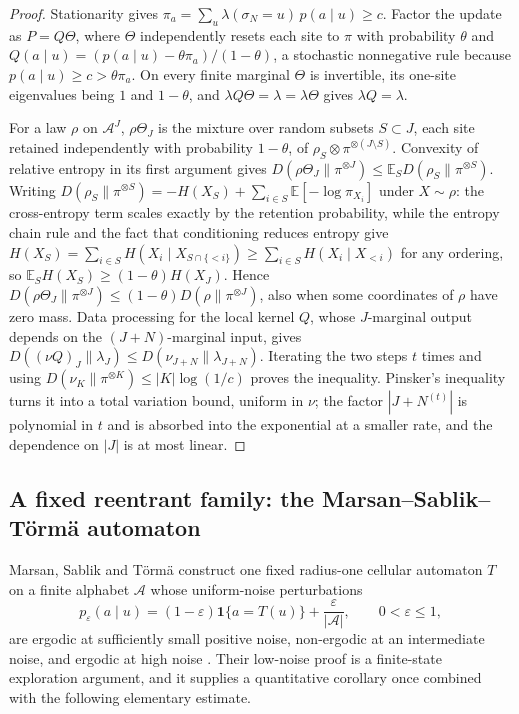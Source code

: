 \documentclass[11pt]{article}
\theoremstyle{plain}
\theoremstyle{definition}
\theoremstyle{remark}
\newcommand{\A}{\mathcal{A}}
\newcommand{\E}{\mathbb{E}}
\newcommand{\eps}{\varepsilon}
\begin{document}
\begin{proof}
Stationarity gives $\pi_a=\sum_u\lambda(\sigma_N=u)\,p(a\mid u)\ge c$. Factor the update as $P=Q\Theta$, where $\Theta$ independently resets each site to $\pi$ with probability $\theta$ and $Q(a\mid u)=(p(a\mid u)-\theta\pi_a)/(1-\theta)$, a stochastic nonnegative rule because $p(a\mid u)\ge c>\theta\pi_a$. On every finite marginal $\Theta$ is invertible, its one-site eigenvalues being $1$ and $1-\theta$, and $\lambda Q\Theta=\lambda=\lambda\Theta$ gives $\lambda Q=\lambda$.

For a law $\rho$ on $\A^J$, $\rho\Theta_J$ is the mixture over random subsets $S\subset J$, each site retained independently with probability $1-\theta$, of $\rho_S\otimes\pi^{\otimes(J\setminus S)}$. Convexity of relative entropy in its first argument gives $D(\rho\Theta_J\|\pi^{\otimes J})\le\E_SD(\rho_S\|\pi^{\otimes S})$. Writing $D(\rho_S\|\pi^{\otimes S})=-H(X_S)+\sum_{i\in S}\E[-\log\pi_{X_i}]$ under $X\sim\rho$: the cross-entropy term scales exactly by the retention probability, while the entropy chain rule and the fact that conditioning reduces entropy give $H(X_S)=\sum_{i\in S}H(X_i\mid X_{S\cap\{<i\}})\ge\sum_{i\in S}H(X_i\mid X_{<i})$ for any ordering, so $\E_SH(X_S)\ge(1-\theta)H(X_J)$. Hence $D(\rho\Theta_J\|\pi^{\otimes J})\le(1-\theta)D(\rho\|\pi^{\otimes J})$, also when some coordinates of $\rho$ have zero mass. Data processing for the local kernel $Q$, whose $J$-marginal output depends on the $(J+N)$-marginal input, gives $D((\nu Q)_J\|\lambda_J)\le D(\nu_{J+N}\|\lambda_{J+N})$. Iterating the two steps $t$ times and using $D(\nu_K\|\pi^{\otimes K})\le|K|\log(1/c)$ proves the inequality. Pinsker's inequality turns it into a total variation bound, uniform in $\nu$; the factor $|J+N^{(t)}|$ is polynomial in $t$ and is absorbed into the exponential at a smaller rate, and the dependence on $|J|$ is at most linear.
\end{proof}

\subsection{A fixed reentrant family: the Marsan--Sablik--T\"orm\"a automaton}
\label{sec:mst}

Marsan, Sablik and T\"orm\"a \cite{MST26} construct one fixed radius-one cellular automaton $T$ on a finite alphabet $\A$ whose uniform-noise perturbations
\begin{equation}
p_\eps(a\mid u)=(1-\eps)\mathbf 1\{a=T(u)\}+\frac{\eps}{|\A|},\qquad0<\eps\le1,
\label{eq:mst}
\end{equation}
are ergodic at sufficiently small positive noise, non-ergodic at an intermediate noise, and ergodic at high noise \cite[Theorem~3.1]{MST26}. Their low-noise proof is a finite-state exploration argument, and it supplies a quantitative corollary once combined with the following elementary estimate.
\end{document}
